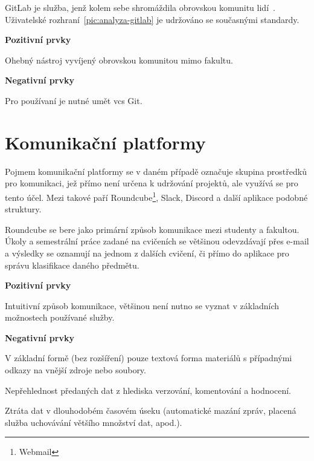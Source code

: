 GitLab je služba, jenž kolem sebe shromáždila obrovskou komunitu lidí~\cite{gitlabSource}. Uživatelské rozhraní~\ref{pic:analyza-gitlab} je udržováno se současnými standardy.

\textbf{Pozitivní prvky}
\begin{ul}
\tightlist
   \item Ohebný nástroj vyvíjený obrovskou komunitou mimo fakultu.
\end{ul}

\textbf{Negativní prvky}
\begin{ul}
   \item Pro používaní je nutné umět \gls{vcs} Git.
\end{ul}




\section{Komunikační platformy}

Pojmem komunikační platformy se v daném případě označuje skupina prostředků pro komunikaci, jež přímo není určena k udržování projektů, ale využívá se pro tento účel. Mezi takové paří Roundcube\footnote{Webmail}, Slack, Discord a další aplikace podobné struktury.

Roundcube se bere jako primární způsob komunikace mezi studenty a fakultou. Úkoly a semestrální práce zadané na cvičeních se většinou odevzdávají přes e-mail a výsledky se oznamují na jednom z dalších cvičení, či přímo do aplikace pro správu klasifikace daného předmětu.

\textbf{Pozitivní prvky}
\begin{ul}
   \item Intuitivní způsob komunikace, většinou není nutno se vyznat v základních možnostech používané služby.
\end{ul}

\textbf{Negativní prvky}
\begin{ul}
   \item V základní formě (bez rozšíření) pouze textová forma materiálů s případnými odkazy na vnější zdroje nebo soubory.
   \item Nepřehlednost předaných dat z hlediska verzování, komentování a hodnocení.
   \item Ztráta dat v dlouhodobém časovém úseku (automatické mazání zpráv, placená služba uchovávání většího množství dat, apod.).
\end{ul}


